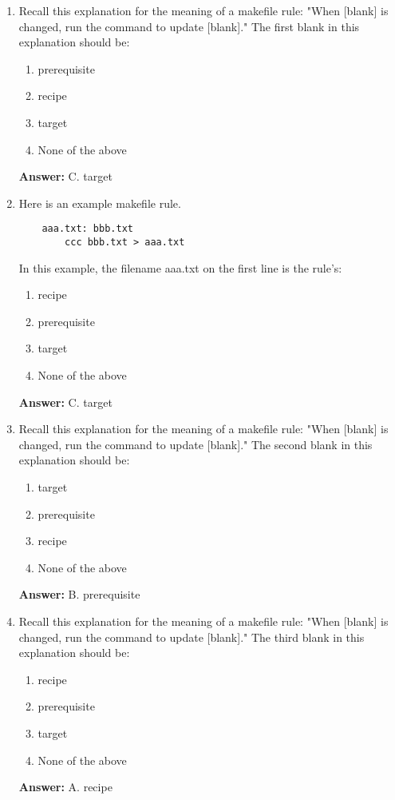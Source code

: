 \documentclass{article}
\begin{document}
\begin{enumerate}
    \item Recall this explanation for the meaning of a makefile rule: "When [blank] is changed, run the command to update [blank]." The first blank in this explanation should be:
    \begin{enumerate}
        \item prerequisite
        \item recipe
        \item target
        \item None of the above
    \end{enumerate}
    \textbf{Answer:} C. target

    \item Here is an example makefile rule.
    \begin{verbatim}
    aaa.txt: bbb.txt
        ccc bbb.txt > aaa.txt
    \end{verbatim}
    In this example, the filename aaa.txt on the first line is the rule's:
    \begin{enumerate}
        \item recipe
        \item prerequisite
        \item target
        \item None of the above
    \end{enumerate}
    \textbf{Answer:} C. target

    \item Recall this explanation for the meaning of a makefile rule: "When [blank] is changed, run the command to update [blank]." The second blank in this explanation should be:
    \begin{enumerate}
        \item target
        \item prerequisite
        \item recipe
        \item None of the above
    \end{enumerate}
    \textbf{Answer:} B. prerequisite

    \item Recall this explanation for the meaning of a makefile rule: "When [blank] is changed, run the command to update [blank]." The third blank in this explanation should be:
    \begin{enumerate}
        \item recipe
        \item prerequisite
        \item target
        \item None of the above
    \end{enumerate}
    \textbf{Answer:} A. recipe


\end{enumerate}
\end{document}
